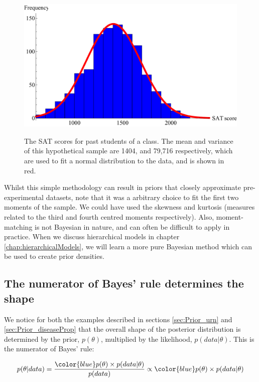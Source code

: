 \documentclass[11pt,fullpage]{book}
\begin{document}
\begin{figure}
\centering
\scalebox{0.75} 
{\includegraphics{Prior_SATScoresHistogram.pdf}}\caption{The SAT scores for past students of a class. The mean and variance of this hypothetical sample are 1404, and 79,716 respectively, which are used to fit a normal distribution to the data, and is shown in red.}\label{fig:Prior_SATScoresHistogram}
\end{figure}


Whilst this simple methodology can result in priors that closely approximate pre-experimental datasets, note that it was a arbitrary choice to fit the first two moments of the sample. We could have used the skewness and kurtosis (measures related to the third and fourth centred moments respectively). Also, moment-matching is not Bayesian in nature, and can often be difficult to apply in practice. When we discuss hierarchical models in chapter \ref{chap:hierarchicalModels}, we will learn a more pure Bayesian method which can be used to create prior densities.

\subsection{The numerator of Bayes' rule determines the shape}\label{sec:Prior_numerator}
We notice for both the examples described in sections \ref{sec:Prior_urn} and \ref{sec:Prior_diseaseProp} that the overall shape of the posterior distribution is determined by the prior, $p(\theta)$, multiplied by the likelihood, $p(data|\theta)$. This is the numerator of Bayes' rule:

\begin{equation}
p(\theta|data) = \frac{{\color{blue}p(\theta)\times p(data|\theta)}}{p(data)} \propto {\color{blue}p(\theta)\times p(data|\theta)}
\end{equation}\label{eq:Prior_BayesNumerator}
\end{document}
